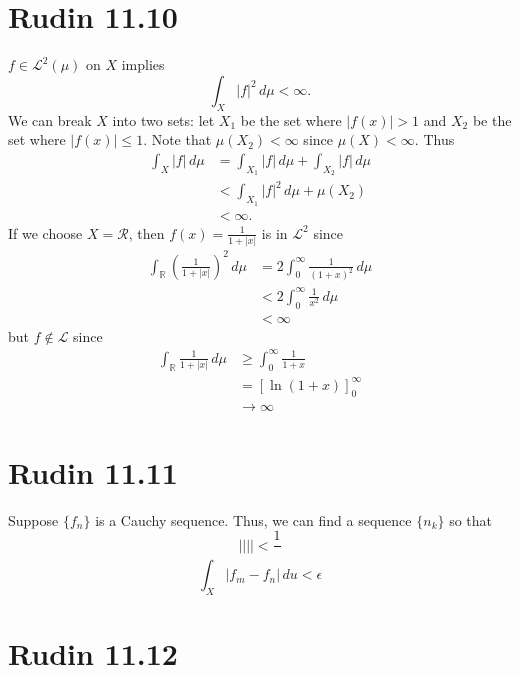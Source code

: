 \documentclass{article}
\begin{document}
\section*{Rudin 11.10}
$f \in \mathscr{L}^2(\mu)$ on $X$ implies 
\[
	\int_X |f|^2 \,d\mu < \infty.
\]
We can break $X$ into two sets:
let $X_1$ be the set where $|f(x)| > 1$ and 
$X_2$ be the set where $|f(x)| \leq 1$.
Note that $\mu(X_2) < \infty$ since $\mu(X) < \infty$.
Thus 
\begin{align*}
	\int_X |f| \,d\mu &= \int_{X_1} |f| \,d\mu + \int_{X_2} |f| \,d\mu \\
	&< \int_{X_1} |f|^2 \,d\mu  + \mu(X_2) \\
	&< \infty.
\end{align*}
If we choose $X = \mathcal{R}$, then $f(x) = \frac{1}{1+|x|}$ is in
$\mathscr{L}^2$ since
\begin{align*}
	\int_{\mathbb{R}} \left(\frac{1}{1+|x|}\right)^2 \,d\mu 
	&= 2\int_0^\infty \frac{1}{(1+x)^2} \,d\mu  \\
	&< 2\int_0^\infty \frac{1}{x^2} \,d\mu \\
	&<\infty 
\end{align*}
but $f \notin \mathscr{L}$ since
\begin{align*}
	\int_{\mathbb{R}} \frac{1}{1+|x|} \,d\mu &\geq \int_0^\infty \frac{1}{1+x} \\
	&= \left[\ln(1+x)\right]_0^\infty \\
	&\to \infty
\end{align*}

\newpage

\section*{Rudin 11.11}
Suppose $\{f_n\}$ is a Cauchy sequence.
Thus, we can find a sequence $\{n_k\}$ so that
\[
	|| || < \frac{1}{}
\]
\[
	\int_X |f_m - f_n| \,du < \epsilon
\]
\newpage

\section*{Rudin 11.12}
\newpage
\end{document}
